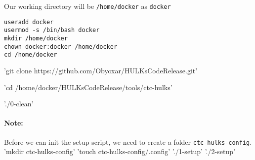 \documentclass{article}
\begin{document}
Our working directory will be \texttt{/home/docker} as \texttt{docker}
\begin{verbatim}
useradd docker
usermod -s /bin/bash docker
mkdir /home/docker
chown docker:docker /home/docker
cd /home/docker
\end{verbatim}

\bash'git clone https://github.com/Obyoxar/HULKsCodeRelease.git'

\bash'cd /home/docker/HULKsCodeRelease/tools/ctc-hulks'

\bash'./0-clean'

\paragraph{Note:} Before we can init the setup script,
we need to create a folder \texttt{ctc-hulks-config}.
\bash'mkdir ctc-hulks-config'
\bash'touch ctc-hulks-config/.config'
\bash'./1-setup'
\bash'./2-setup'
\end{document}
